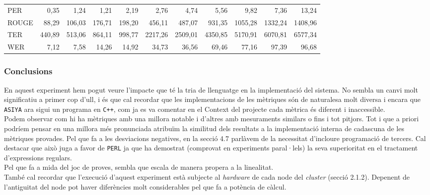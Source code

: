 \documentclass[11pt,a4paper]{article}
\begin{document}
\begin{table}[H]
{\begin{tabular}{l r r | r r | r r | r r | r r }
PER    & 0,35     & 1,24     & 1,21      & 2,19     & 2,76      & 4,74     & 5,56       & 9,82     & 7,36       & 13,24    \\
ROUGE  & 88,29    & 106,03   & 176,71    & 198,20   & 456,11    & 487,07   & 931,35     & 1055,28  & 1332,24    & 1408,96  \\
TER    & 440,89   & 513,06   & 864,11    & 998,77   & 2217,26   & 2509,01  & 4350,85    & 5170,91  & 6070,81    & 6577,34  \\
WER    & 7,12     & 7,58     & 14,26     & 14,92    & 34,73     & 36,56    & 69,46      & 77,16    & 97,39      & 96,68    \\ \hline
\end{tabular}}
\label{table:Ex1-ws_corpus2000}
\normalsize
\end{table}


\afterpage{\clearpage}
\subsubsection{Conclusions}
En aquest experiment hem pogut veure l'impacte que té la tria de llenguatge en la implementació del sistema. No sembla un canvi molt significatiu a primer cop d'ull, i és que cal recordar que les implementacions de les mètriques són de naturalesa molt diversa i encara que \texttt{ASIYA} ara sigui un programa en \texttt{C++}, com ja es va comentar en el Context del projecte cada mètrica és diferent i inaccessible.
\\

Podem observar com hi ha mètriques amb una millora notable i d'altres amb mesuraments similars o fins i tot pitjors. Tot i que a priori podríem pensar en una millora més pronunciada atribuïm la similitud dels resultats a la implementació interna de cadascuna de les mètriques provades. Pel que fa a les desviacions negatives, en la secció 4.7 parlàvem de la necessitat d'incloure programació de tercers. Cal destacar que això juga a favor de \texttt{PERL} ja que ha demostrat (comprovat en experiments paral·lels) la seva superioritat en el tractament d'expressions regulars.
\\

Pel que fa a mida del joc de proves, sembla que escala de manera propera a la linealitat.
\\

També cal recordar que l'execució d'aquest experiment està subjecte al \textit{hardware} de cada node del \textit{cluster} (secció 2.1.2). Depenent de l'antiguitat del node pot haver diferències molt considerables pel que fa a potència de càlcul.
\\
\end{document}

